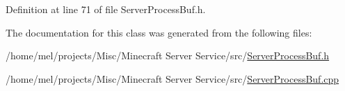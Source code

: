 Definition at line 71 of file Server\+Process\+Buf.\+h.



The documentation for this class was generated from the following files\+:\begin{DoxyCompactItemize}
\item 
/home/mel/projects/\+Misc/\+Minecraft Server Service/src/\hyperlink{_server_process_buf_8h}{Server\+Process\+Buf.\+h}\item 
/home/mel/projects/\+Misc/\+Minecraft Server Service/src/\hyperlink{_server_process_buf_8cpp}{Server\+Process\+Buf.\+cpp}\end{DoxyCompactItemize}
